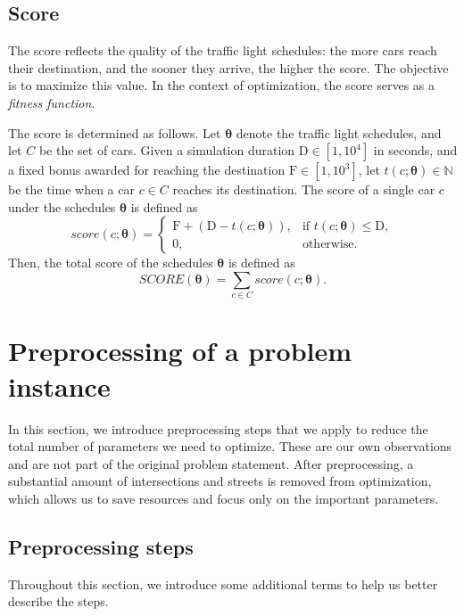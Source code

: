 \subsection{Score}

The score reflects the quality of the traffic light schedules: the more cars reach their destination, and the sooner they arrive, the higher the score.
The objective is to maximize this value.
In the context of optimization, the score serves as a \textit{fitness function}.

The score is determined as follows. Let $\bm{\theta}$ denote the traffic light schedules, and let $C$ be the set of cars.
Given a simulation duration $\mathrm{D} \in [1, 10^4]$ in seconds,
and a fixed bonus awarded for reaching the destination $\mathrm{F} \in [1, 10^3]$,
let $t(c; \bm{\theta}) \in \mathbb{N}$ be the time when a car $c \in C$ reaches its destination.
The score of a single car $c$ under the schedules $\bm{\theta}$ is defined as
\begin{equation}
    score(c; \bm{\theta}) =
    \begin{cases}
        \mathrm{F} + (\mathrm{D} - t(c; \bm{\theta})), & \text{if $t(c; \bm{\theta}) \leq \mathrm{D}$}, \\
        0, & \text{otherwise}.
    \end{cases}
\end{equation}
Then, the total score of the schedules $\bm{\theta}$ is defined as
\begin{equation}
    SCORE(\bm{\theta}) = \sum_{c \in C} score(c; \bm{\theta}).
\end{equation}

\section{Preprocessing of a problem instance} \label{sec:preprocessing}

In this section, we introduce preprocessing steps that we apply to reduce the total number of parameters we need to optimize.
These are our own observations and are not part of the original problem statement. After preprocessing, a substantial amount of intersections and streets is removed from optimization, which allows us to save resources and focus only on the important parameters.

\subsection{Preprocessing steps}
Throughout this section, we introduce some additional terms to help us better describe the steps.


